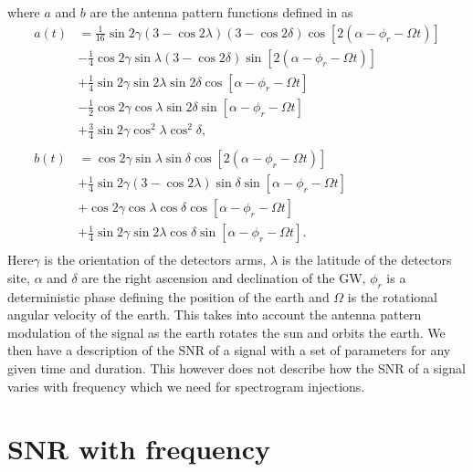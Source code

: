 where $a$ and $b$ are the antenna pattern functions defined in \citep{schutz1998DataAnalysis} as
\begin{equation}
\begin{split}
a(t) &= \frac{1}{16}\sin{2\gamma}(3-\cos{2\lambda})(3-\cos2\delta)\cos[2(\alpha-\phi_r -\Omega t)] \\
&- \frac{1}{4}\cos{2\gamma}\sin\lambda(3-\cos2\delta)\sin[2(\alpha-\phi_r -\Omega t)] \\
&+ \frac{1}{4}\sin{2\gamma}\sin2\lambda\sin2\delta\cos[\alpha-\phi_r -\Omega t] \\
&- \frac{1}{2}\cos{2\gamma}\cos{\lambda}\sin{2\delta}\sin[\alpha-\phi_r -\Omega t] \\
&+ \frac{3}{4}\sin{2\gamma}\cos^2{\lambda}\cos^2{\delta} ,\\
\\
b(t) &= \cos{2\gamma}\sin{\lambda}\sin{\delta}\cos[2(\alpha-\phi_r -\Omega t)] \\
&+ \frac{1}{4}\sin{2\gamma}(3-\cos2\lambda)\sin{\delta}\sin[\alpha-\phi_r -\Omega t] \\
&+ \cos{2\gamma}\cos{\lambda}\cos{\delta}\cos[\alpha-\phi_r -\Omega t] \\
&+ \frac{1}{4}\sin{2\gamma}\sin{2\lambda}\cos{\delta}\sin[\alpha-\phi_r -\Omega t] .\\
\end{split}
\end{equation}
Here$\gamma$ is the orientation of the detectors arms, $\lambda$ is the latitude of the detectors site, $\alpha$ and $\delta$ are the right ascension and declination of the \gls{GW}, $\phi_r$ is a deterministic phase defining the position of the earth and $\Omega$ is the rotational angular velocity of the earth.
This takes into account the antenna pattern modulation of the signal as the earth rotates the sun and orbits the earth.
We then have a description of the \gls{SNR} of a signal with a set of parameters for any given time and duration. 
This however does not describe how the \gls{SNR} of a signal varies with frequency which we need for spectrogram injections.

\section{SNR with frequency}

